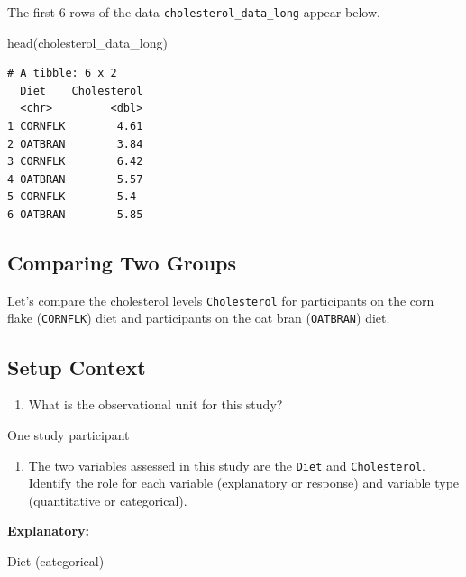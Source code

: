 \documentclass[
  letterpaper,
  DIV=11,
  numbers=noendperiod]{scrartcl}
\newenvironment{Shaded}{\begin{snugshade}}{\end{snugshade}}
\newcommand{\FunctionTok}[1]{\textcolor[rgb]{0.28,0.35,0.67}{#1}}
\newcommand{\NormalTok}[1]{\textcolor[rgb]{0.00,0.23,0.31}{#1}}
\providecommand{\tightlist}{%
  \setlength{\itemsep}{0pt}\setlength{\parskip}{0pt}}\usepackage{longtable,booktabs,array}
\begin{document}
The first 6 rows of the data \texttt{cholesterol\_data\_long} appear
below.

\begin{Shaded}
\begin{Highlighting}[]
\FunctionTok{head}\NormalTok{(cholesterol\_data\_long)}
\end{Highlighting}
\end{Shaded}

\begin{verbatim}
# A tibble: 6 x 2
  Diet    Cholesterol
  <chr>         <dbl>
1 CORNFLK        4.61
2 OATBRAN        3.84
3 CORNFLK        6.42
4 OATBRAN        5.57
5 CORNFLK        5.4 
6 OATBRAN        5.85
\end{verbatim}

\hypertarget{comparing-two-groups}{%
\subsection{Comparing Two Groups}\label{comparing-two-groups}}

Let's compare the cholesterol levels \texttt{Cholesterol} for
participants on the corn flake (\texttt{CORNFLK}) diet and participants
on the oat bran (\texttt{OATBRAN}) diet.

\hypertarget{setup-context}{%
\subsection{Setup Context}\label{setup-context}}

\begin{enumerate}
\def\labelenumi{\arabic{enumi}.}
\tightlist
\item
  What is the observational unit for this study?
\end{enumerate}

One study participant

\begin{enumerate}
\def\labelenumi{\arabic{enumi}.}
\setcounter{enumi}{1}
\tightlist
\item
  The two variables assessed in this study are the \texttt{Diet} and
  \texttt{Cholesterol}. Identify the role for each variable (explanatory
  or response) and variable type (quantitative or categorical).
\end{enumerate}

\vspace{0.5in}

\textbf{Explanatory:}

Diet (categorical)
\end{document}
